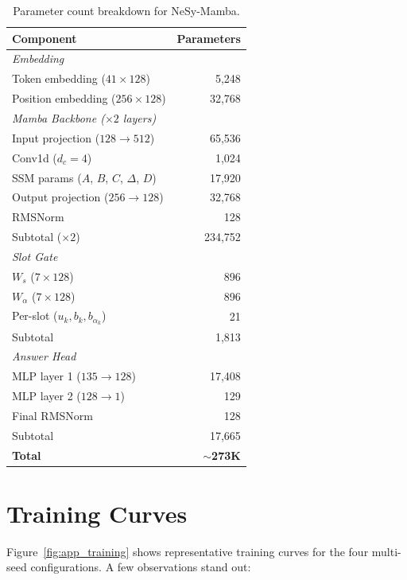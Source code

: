 \documentclass[conference]{IEEEtran}
\DeclareRobustCommand{\model}{NeSy-Mamba}
\begin{document}
\begin{table}[H]
\centering
\small
\caption{Parameter count breakdown for \model{}.}
\label{tab:params_breakdown}
\begin{tabular}{@{}lr@{}}
\toprule
\textbf{Component} & \textbf{Parameters} \\
\midrule
\multicolumn{2}{l}{\textit{Embedding}} \\
Token embedding ($41 \times 128$) & 5,248 \\
Position embedding ($256 \times 128$) & 32,768 \\
\midrule
\multicolumn{2}{l}{\textit{Mamba Backbone ($\times 2$ layers)}} \\
Input projection ($128 \to 512$) & 65,536 \\
Conv1d ($d_c = 4$) & 1,024 \\
SSM params ($A$, $B$, $C$, $\Delta$, $D$) & 17,920 \\
Output projection ($256 \to 128$) & 32,768 \\
RMSNorm & 128 \\
Subtotal ($\times 2$) & 234,752 \\
\midrule
\multicolumn{2}{l}{\textit{Slot Gate}} \\
$W_s$ ($7 \times 128$) & 896 \\
$W_\alpha$ ($7 \times 128$) & 896 \\
Per-slot ($u_k, b_k, b_{\alpha_k}$) & 21 \\
Subtotal & 1,813 \\
\midrule
\multicolumn{2}{l}{\textit{Answer Head}} \\
MLP layer 1 ($135 \to 128$) & 17,408 \\
MLP layer 2 ($128 \to 1$) & 129 \\
Final RMSNorm & 128 \\
Subtotal & 17,665 \\
\midrule
\textbf{Total} & \textbf{$\sim$273K} \\
\bottomrule
\end{tabular}
\end{table}

\section{Training Curves}
\label{app:training}

Figure~\ref{fig:app_training} shows representative training curves
for the four multi-seed configurations. A few observations stand out:
\end{document}
